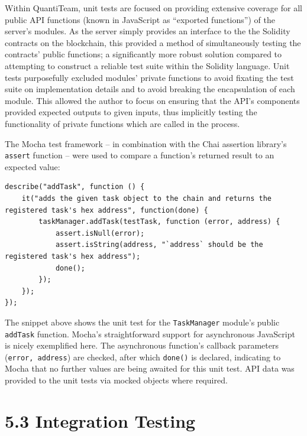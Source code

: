 Within QuantiTeam, unit tests are focused on providing extensive
coverage for all public API functions (known in JavaScript as ``exported
functions'') of the server's modules. As the server simply provides an
interface to the the Solidity contracts on the blockchain, this provided
a method of simultaneously testing the contracts' public functions; a
significantly more robust solution compared to attempting to construct a
reliable test suite within the Solidity language. Unit tests
purposefully excluded modules' private functions to avoid fixating the
test suite on implementation details and to avoid breaking the
encapsulation of each
module\cite{hunt2003pragmatic}. This allowed the author to focus on ensuring that the API's
components provided expected outputs to given inputs, thus implicitly
testing the functionality of private functions which are called in the
process.

The Mocha test framework -- in combination with the Chai assertion
library's \texttt{assert} function -- were used to compare a function's
returned result to an expected value:

\begin{verbatim}
describe("addTask", function () {
    it("adds the given task object to the chain and returns the registered task's hex address", function(done) {
        taskManager.addTask(testTask, function (error, address) {
            assert.isNull(error);
            assert.isString(address, "`address` should be the registered task's hex address");
            done();
        });
    });
});
\end{verbatim}

The snippet above shows the unit test for the \texttt{TaskManager}
module's public \texttt{addTask} function. Mocha's straightforward
support for asynchronous JavaScript is nicely exemplified here. The
asynchronous function's callback parameters (\texttt{error,\ address})
are checked, after which \texttt{done()} is declared, indicating to
Mocha that no further values are being awaited for this unit test. API data was provided to the unit tests via mocked objects where
required.

\section{5.3 Integration Testing}\label{integration-testing}

